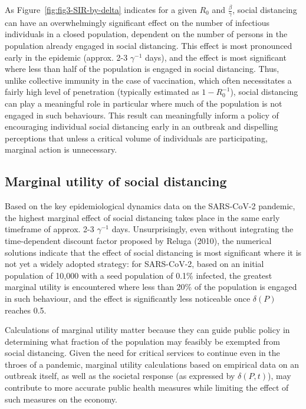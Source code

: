 \documentclass{article}
\begin{document}
As Figure~\ref{fig:fig3-SIR-by-delta} indicates for a given $R_0$ and $\frac{\beta}{\gamma}$, social distancing can have an overwhelmingly significant effect on the number of infectious individuals in a closed population, dependent on the number of persons in the population already engaged in social distancing. This effect is most pronounced early in the epidemic (approx. 2-3 $\gamma^{-1}$ days), and the effect is most significant where less than half of the population is engaged in social distancing. Thus, unlike collective immunity in the case of vaccination, which often necessitates a fairly high level of penetration (typically estimated as $1 - R_0^{-1}$), social distancing can play a meaningful role in particular where much of the population is not engaged in such behaviours. This result can meaningfully inform a policy of encouraging individual social distancing early in an outbreak and dispelling perceptions that unless a critical volume of individuals are participating, marginal action is unnecessary.


\subsection{Marginal utility of social distancing} %
\label{sub:marginal_utility_of_social_distancing}

Based on the key epidemiological dynamics data on the SARS-CoV-2 pandemic, the highest marginal effect of social distancing takes place in the same early timeframe of approx. 2-3 $\gamma^{-1}$ days. Unsurprisingly, even without integrating the time-dependent discount factor proposed by Reluga (2010), the numerical solutions indicate that the effect of social distancing is most significant where it is not yet a widely adopted strategy: for SARS-CoV-2, based on an initial population of 10,000 with a seed population of 0.1\% infected, the greatest marginal utility is encountered where less than 20\% of the population is engaged in such behaviour, and the effect is significantly less noticeable once $\delta(P)$ reaches 0.5.

Calculations of marginal utility matter because they can guide public policy in determining what fraction of the population may feasibly be exempted from social distancing. Given the need for critical services to continue even in the throes of a pandemic, marginal utility calculations based on empirical data on an outbreak itself, as well as the societal response (as expressed by $\delta(P, t)$), may contribute to more accurate public health measures while limiting the effect of such measures on the economy. 
\end{document}
